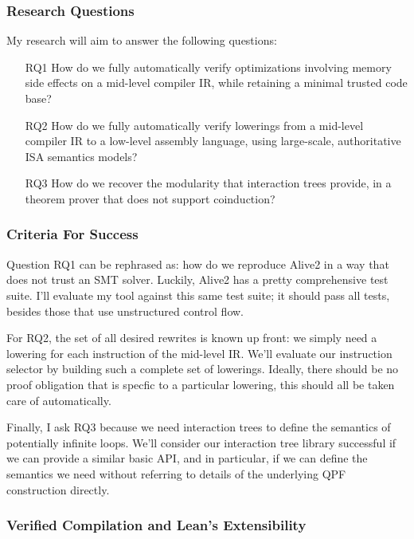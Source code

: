 \documentclass[a4paper]{scrartcl}
\begin{document}
\subsubsection*{Research Questions}

My research will aim to answer the following questions:
\begin{enumerate}
  \item[\textsc{RQ1}]\label{research-question-1}
    How do we fully automatically verify optimizations involving memory side effects on a mid-level compiler IR, 
    while retaining a minimal trusted code base?

  \item[\textsc{RQ2}]
    How do we fully automatically verify lowerings from a mid-level compiler IR
  to a low-level assembly language, using large-scale, authoritative ISA semantics models?

  \item[\textsc{RQ3}] 
    How do we recover the modularity that interaction trees provide,
      in a theorem prover that does not support coinduction?
\end{enumerate}

\subsubsection*{Criteria For Success}

Question \textsc{RQ1} can be rephrased as: 
how do we reproduce Alive2 in a way that does not trust an SMT solver. 
Luckily, Alive2 has a pretty comprehensive test suite.
I'll evaluate my tool against this same test suite; it should pass all tests,
besides those that use unstructured control flow.

For \textsc{RQ2}, the set of all desired rewrites is known up front: we simply 
need a lowering for each instruction of the mid-level IR.
We'll evaluate our instruction selector by building such a complete set of lowerings.
Ideally, there should be no proof obligation that is specfic to a particular lowering,
this should all be taken care of automatically.

Finally, I ask \textsc{RQ3} because we need interaction trees to define the semantics
of potentially infinite loops. 
We'll consider our interaction tree library successful if
we can provide a similar basic API, and in particular, if we can define the 
semantics we need without referring to details of the underlying QPF construction directly.

\subsubsection*{Verified Compilation and Lean's Extensibility}
\end{document}
